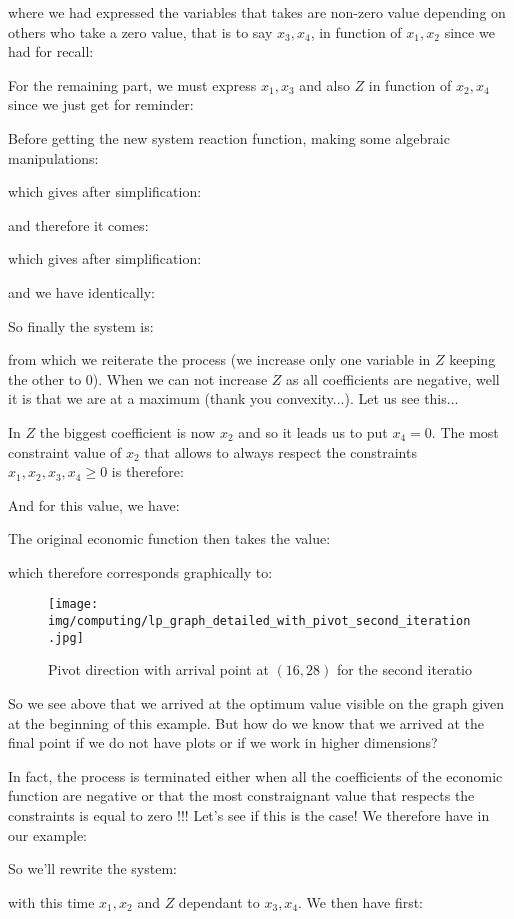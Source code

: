 	where we had expressed the variables that takes are non-zero value depending on others who take a zero value, that is to say $x_3,x_4$, in function of $x_1,x_2$ since we had for recall:
	
	For the remaining part, we must express $x_1,x_3$ and also $Z$ in function of $x_2,x_4$ since we just get for reminder:
	
	Before getting the new system reaction function, making some algebraic manipulations:
	
	which gives after simplification:
	
	and therefore it comes:
	
	which gives after simplification:
	
	and we have identically:
	
	So finally the system is:
	
	from which we reiterate the process (we increase only one  variable in $Z$ keeping the other to $0$). When we can not increase $Z$ as all coefficients are negative, well it is that we are at a maximum (thank you convexity...). Let us see this...
	
	In $Z$ the biggest coefficient is now $x_2$ and so it leads us to put $x_4=0$. The most constraint value of $x_2$ that allows to always respect the constraints $x_1,x_2,x_3,x_4\geq 0$ is therefore:
	
	And for this value, we have:
	
	The original economic function then takes the value:
	
	which therefore corresponds graphically to:
	\begin{figure}[H]
		\centering
		\texttt{[image: img/computing/lp\_graph\_detailed\_with\_pivot\_second\_iteration.jpg]}
		\caption{Pivot direction with arrival point at $(16, 28)$ for the second iteratio}
	\end{figure}
	So we see above that we arrived at the optimum value visible on the graph given at the beginning of this example. But how do we know that we arrived at the final point if we do not have plots or if we work in higher dimensions?
	
	In fact, the process is terminated either when all the coefficients of the economic function are negative or that the most constraignant value that respects the constraints is equal to zero !!! Let's see if this is the case! We therefore have in our example:
	
	So we'll rewrite the system:
	
	with this time $x_1,x_2$ and $Z$ dependant to $x_3,x_4$. We then have first:
	
